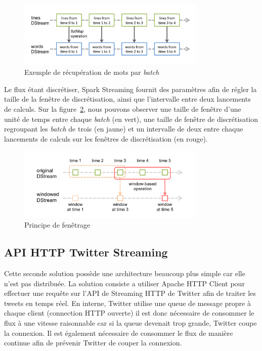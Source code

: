   \begin{figure}
    \centering
    \includegraphics[width=0.8\textwidth]{images/streaming-dstream-ops.png}
    \caption{Exemple de récupération de mots par \emph{batch}}
    \label{streaming_dstream_get_word}
  \end{figure}

  Le flux étant discrétiser, Spark Streaming fournit des paramètres afin de régler la taille de la fenêtre de discrétisation, ainsi que l'intervalle entre deux lancements de calculs. Sur la figure~\ref{principe_de_fenetre_spark_streaming}, nous pouvons observer une taille de fenêtre d'une unité de temps entre chaque \emph{batch} (en vert), une taille de fenêtre de discrétisation regroupant les \emph{batch} de trois (en jaune) et un intervalle de deux entre chaque lancements de calculs sur les fenêtres de discrétisation (en rouge).

  \begin{figure}
    \centering
    \includegraphics[width=0.8\textwidth]{images/streaming-dstream-window.png}
    \caption{Principe de fenêtrage}
    \label{principe_de_fenetre_spark_streaming}
  \end{figure}

  \subsection{API HTTP Twitter Streaming }
  \label{sub:API HTTP Twitter Streaming}
  Cette seconde solution possède une architecture beaucoup plus simple car elle n'est pas distribuée. La solution consiste a utiliser Apache HTTP Client pour effectuer une requête sur l'API de Streaming HTTP de Twitter afin de traiter les tweets en temps réel. En interne, Twitter utilise une queue de message propre à chaque client (connection HTTP ouverte) il est donc nécessaire de consommer le flux à une vitesse raisonnable car si la queue devenait trop grande, Twitter coupe la connexion. Il est également nécessaire de consommer le flux de manière continue afin de prévenir Twitter de couper la connexion.\\

